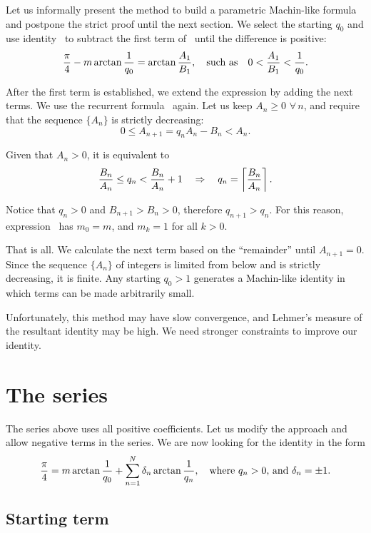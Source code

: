 \documentclass[draft, 10pt]{article} %
\begin{document}
Let us informally present the method to build a parametric Machin-like formula and postpone
the strict proof until the next section.
We select the starting $q_0$ and use identity~ to subtract
the first term of~ until the difference is positive:
$$
\dfrac{\pi}{4} - m \arctan\dfrac{1}{q_0} = \arctan\dfrac{A_1}{B_1}, \quad\hbox{such as}\quad
0 < \dfrac{A_1}{B_1} < \dfrac{1}{q_0}.
$$

After the first term is established,
we extend the expression by adding the next terms.
We use the recurrent formula~ again.
Let us keep $A_n \ge 0$ $\forall \, n$,
and require that the sequence $\{ A_n \}$ is strictly decreasing:
$$
0 \le A_{n+1} = q_n A_n - B_n < A_n.
$$

Given that $A_n > 0$, it is equivalent to
$$
\dfrac{B_n}{A_n} \le q_n < \dfrac{B_n}{A_n} + 1 \quad\ergo\quad 
q_n = \nceil{\dfrac{B_n}{A_n}}.
$$

Notice that $q_n > 0$ and $B_{n+1} > B_n > 0$, therefore $q_{n+1} > q_n$.
For this reason, expression~ has $m_0 = m$, and $m_k = 1$ for all $k>0$.

That is all. We calculate the next term based on the ``remainder'' until $A_{n+1} = 0$.
Since the sequence $\{ A_n \}$ of integers is limited from below and is strictly decreasing, it is finite.
Any starting $q_0 > 1$ generates a Machin-like identity in which terms
can be made arbitrarily small.

Unfortunately, this method may have slow convergence, and Lehmer's measure of
the resultant identity may be high.
We need stronger constraints to improve our identity.
 
\section{The series}

The series above uses all positive coefficients. Let us modify the approach and allow
negative terms in the series. We are now looking for the identity in the form
%
\begin{equation}\mlabel{machin-switch}
\dfrac{\pi}{4} = m \arctan \dfrac{1}{q_0} +
    \sum_{n=1}^N \delta_n \arctan \dfrac{1}{q_n},
    \quad\hbox{where $q_n > 0$, and $\delta_n=\pm 1$.}
\end{equation}

\subsection{Starting term}
\end{document}
